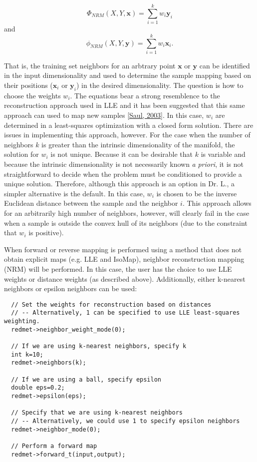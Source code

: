 \[ \Phi_{NRM}(X,Y,\mathbf{x})=\displaystyle\sum_{i=1}^k w_i\mathbf{y}_i \] and \[ \phi_{NRM}(X,Y,\mathbf{y})=\displaystyle\sum_{i=1}^k w_i\mathbf{x}_i. \]

That is, the training set neighbors for an arbtrary point $\mathbf{x}$ or $\mathbf{y}$ can be identified in the input dimensionality and used to determine the sample mapping based on their positions ($\mathbf{x}_i$ or $\mathbf{y}_i$) in the desired dimensionality. The question is how to choose the weights $w_i$. The equations bear a strong resemblence to the reconstruction approach used in LLE and it has been suggested that this same approach can used to map new samples \hyperlink{index_ref}{\mbox{[}Saul, 2003\mbox{]}}. In this case, $w_i$ are determined in a least-squares optimization with a closed form solution. There are issues in implementing this approach, however. For the case when the number of neighbors $k$ is greater than the intrinsic dimensionality of the manifold, the solution for $w_i$ is not unique. Because it can be desirable that $k$ is variable and because the intrinsic dimensionality is not necessarily known {\em a\/} {\em priori\/}, it is not straightforward to decide when the problem must be conditioned to provide a unique solution. Therefore, although this approach is an option in Dr. L., a simpler alternative is the default. In this case, $w_i$ is chosen to be the inverse Euclidean distance between the sample and the neighbor $i$. This approach allows for an arbitrarily high number of neighbors, however, will clearly fail in the case when a sample is outside the convex hull of its neighbors (due to the constraint that $w_i$ is positive).

When forward or reverse mapping is performed using a method that does not obtain explicit maps (e.g. LLE and Iso\-Map), neighbor reconstruction mapping (NRM) will be performed. In this case, the user has the choice to use LLE weights or distance weights (as described above). Additionally, either k-nearest neighbors or epsilon neighbors can be used:



\footnotesize\begin{verbatim}  // Set the weights for reconstruction based on distances
  // -- Alternatively, 1 can be specified to use LLE least-squares weighting.
  redmet->neighbor_weight_mode(0);
  
  // If we are using k-nearest neighbors, specify k
  int k=10;
  redmet->neighbors(k);
  
  // If we are using a ball, specify epsilon
  double eps=0.2;
  redmet->epsilon(eps);
  
  // Specify that we are using k-nearest neighbors
  // -- Alternatively, we could use 1 to specify epsilon neighbors
  redmet->neighbor_mode(0);

  // Perform a forward map
  redmet->forward_t(input,output);
\end{verbatim}
\normalsize


